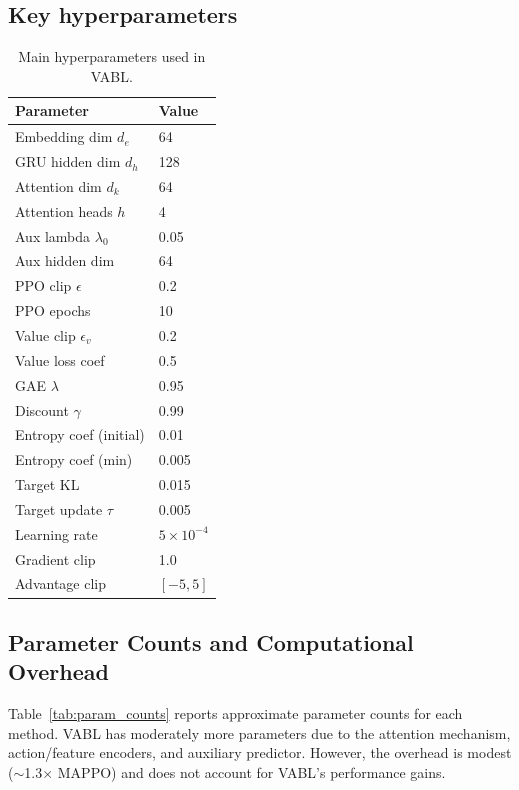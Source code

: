 \documentclass{article}
\theoremstyle{plain}
\theoremstyle{definition}
\theoremstyle{remark}
\begin{document}
\subsection{Key hyperparameters}
\begin{table}[h]
\centering
\begin{tabular}{ll}
\toprule
\textbf{Parameter} & \textbf{Value} \\
\midrule
Embedding dim $d_e$ & 64 \\
GRU hidden dim $d_h$ & 128 \\
Attention dim $d_k$ & 64 \\
Attention heads $h$ & 4 \\
Aux lambda $\lambda_0$ & 0.05 \\
Aux hidden dim & 64 \\
PPO clip $\epsilon$ & 0.2 \\
PPO epochs & 10 \\
Value clip $\epsilon_v$ & 0.2 \\
Value loss coef & 0.5 \\
GAE $\lambda$ & 0.95 \\
Discount $\gamma$ & 0.99 \\
Entropy coef (initial) & 0.01 \\
Entropy coef (min) & 0.005 \\
Target KL & 0.015 \\
Target update $\tau$ & 0.005 \\
Learning rate & $5 \times 10^{-4}$ \\
Gradient clip & 1.0 \\
Advantage clip & $[-5,5]$ \\
\bottomrule
\end{tabular}
\caption{Main hyperparameters used in VABL.}
\label{tab:hyperparams}
\end{table}

\subsection{Parameter Counts and Computational Overhead}
\label{app:params}

Table~\ref{tab:param_counts} reports approximate parameter counts for each method. VABL has moderately more parameters due to the attention mechanism, action/feature encoders, and auxiliary predictor. However, the overhead is modest ($\sim$1.3$\times$ MAPPO) and does not account for VABL's performance gains.
\end{document}
